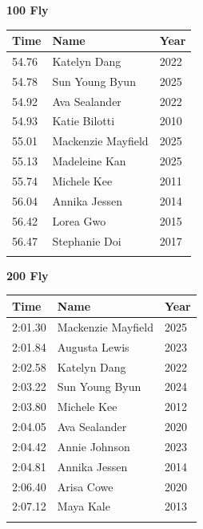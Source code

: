 \vspace{1.2em}
\noindent\begin{minipage}[t]{0.48\textwidth}
\centering
\textbf{\textcolor{teamprimary}{100 Fly}}\par
\vspace{0.5em}
\centering
\small
\renewcommand{\arraystretch}{1.0}
\setlength{\tabcolsep}{4pt}
\begin{tabular}{@{}p{1.8cm}p{3.0cm}p{1.0cm}@{}}
\toprule
\textbf{Time} & \textbf{Name} & \textbf{Year} \\
\midrule
54.76 & Katelyn Dang & 2022 \\
54.78 & Sun Young Byun & 2025 \\
54.92 & Ava Sealander & 2022 \\
54.93 & Katie Bilotti & 2010 \\
55.01 & Mackenzie Mayfield & 2025 \\
55.13 & Madeleine Kan & 2025 \\
55.74 & Michele Kee & 2011 \\
56.04 & Annika Jessen & 2014 \\
56.42 & Lorea Gwo & 2015 \\
56.47 & Stephanie Doi & 2017 \\
\bottomrule
\vspace{0.5em}
\end{tabular}
\end{minipage}
\hfill
\begin{minipage}[t]{0.48\textwidth}
\centering
\textbf{\textcolor{teamprimary}{200 Fly}}\par
\vspace{0.5em}
\centering
\small
\renewcommand{\arraystretch}{1.0}
\setlength{\tabcolsep}{4pt}
\begin{tabular}{@{}p{1.8cm}p{3.0cm}p{1.0cm}@{}}
\toprule
\textbf{Time} & \textbf{Name} & \textbf{Year} \\
\midrule
2:01.30 & Mackenzie Mayfield & 2025 \\
2:01.84 & Augusta Lewis & 2023 \\
2:02.58 & Katelyn Dang & 2022 \\
2:03.22 & Sun Young Byun & 2024 \\
2:03.80 & Michele Kee & 2012 \\
2:04.05 & Ava Sealander & 2020 \\
2:04.42 & Annie Johnson & 2023 \\
2:04.81 & Annika Jessen & 2014 \\
2:06.40 & Arisa Cowe & 2020 \\
2:07.12 & Maya Kale & 2013 \\
\bottomrule
\vspace{0.5em}
\end{tabular}
\end{minipage}
